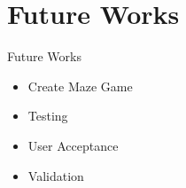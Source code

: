 \section{Future Works}
\begin{frame}{Future Works}
\begin{itemize}
    \item Create Maze Game
    \item Testing
    \item User Acceptance
    \item Validation
\end{itemize}
\end{frame}
